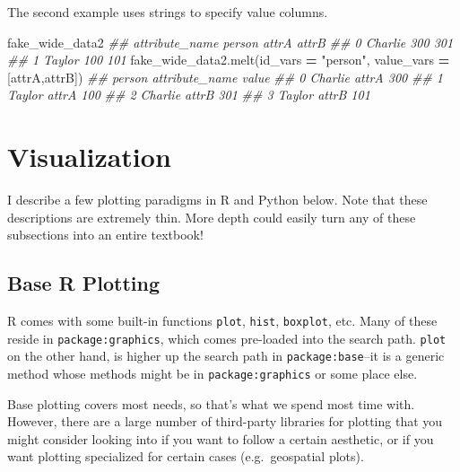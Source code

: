 \documentclass[
  12pt,
]{krantz}
\makeatletter
\newenvironment{Shaded}{\begin{snugshade}}{\end{snugshade}}
\newcommand{\CommentTok}[1]{\textcolor[rgb]{0.37,0.37,0.37}{\textit{#1}}}
\newcommand{\NormalTok}[1]{#1}
\newcommand{\OperatorTok}[1]{\textcolor[rgb]{0.43,0.43,0.43}{\textbf{#1}}}
\newcommand{\StringTok}[1]{\textcolor[rgb]{0.5,0.5,0.5}{#1}}
\newenvironment{kframe}{%
\medskip{}
\setlength{\fboxsep}{.8em}
 \def\at@end@of@kframe{}%
 \ifinner\ifhmode%
  \def\at@end@of@kframe{\end{minipage}}%
  \begin{minipage}{\columnwidth}%
 \fi\fi%
 \def\FrameCommand##1{\hskip\@totalleftmargin \hskip-\fboxsep
 \colorbox{shadecolor}{##1}\hskip-\fboxsep
     \hskip-\linewidth \hskip-\@totalleftmargin \hskip\columnwidth}%
 \MakeFramed {\advance\hsize-\width
   \@totalleftmargin\z@ \linewidth\hsize
   \@setminipage}}%
 {\par\unskip\endMakeFramed%
 \at@end@of@kframe}
\renewenvironment{Shaded}{\begin{kframe}}{\end{kframe}}
\makeatother
\begin{document}
The second example uses strings to specify value columns.

\begin{Shaded}
\begin{Highlighting}[]
\NormalTok{fake\_wide\_data2}
\CommentTok{\#\# attribute\_name   person  attrA  attrB}
\CommentTok{\#\# 0               Charlie    300    301}
\CommentTok{\#\# 1                Taylor    100    101}
\NormalTok{fake\_wide\_data2.melt(id\_vars }\OperatorTok{=} \StringTok{"person"}\NormalTok{, value\_vars }\OperatorTok{=}\NormalTok{ [}\StringTok{\textquotesingle{}attrA\textquotesingle{}}\NormalTok{,}\StringTok{\textquotesingle{}attrB\textquotesingle{}}\NormalTok{])}
\CommentTok{\#\#     person attribute\_name  value}
\CommentTok{\#\# 0  Charlie          attrA    300}
\CommentTok{\#\# 1   Taylor          attrA    100}
\CommentTok{\#\# 2  Charlie          attrB    301}
\CommentTok{\#\# 3   Taylor          attrB    101}
\end{Highlighting}
\end{Shaded}

\hypertarget{visualization}{%
\chapter{Visualization}\label{visualization}}

I describe a few plotting paradigms in R and Python below. Note that these descriptions are extremely thin. More depth could easily turn any of these subsections into an entire textbook!

\hypertarget{base-r-plotting}{%
\section{Base R Plotting}\label{base-r-plotting}}

R comes with some built-in functions \texttt{plot}, \texttt{hist}, \texttt{boxplot}, etc. Many of these reside in \texttt{package:graphics}, which comes pre-loaded into the search path. \texttt{plot} on the other hand, is higher up the search path in \texttt{package:base}--it is a generic method whose methods might be in \texttt{package:graphics} or some place else.

Base plotting covers most needs, so that's what we spend most time with. However, there are a large number of third-party libraries for plotting that you might consider looking into if you want to follow a certain aesthetic, or if you want plotting specialized for certain cases (e.g.~geospatial plots).
\end{document}
